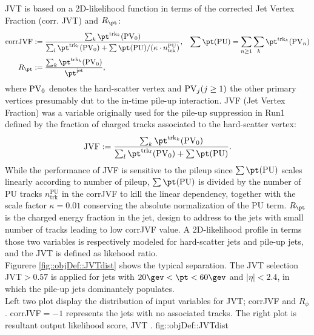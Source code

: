 JVT is based on a 2D-likelihood function in terms of the corrected Jet Vertex Fraction (corr. JVT) and $R_{\pt}$:
\begin{align}
\mathrm{corrJVF} & := \frac{ \sum_k \pttk (\pv_0)  }{\sum_l \pttl (\pv_0) + \sum\pt(\mathrm{PU})/ (\kappa \cdot n_{\mathrm{trk}}^{\mathrm{PU}} )  }
,  \,\,\,\,\,  \sum\pt(\mathrm{PU}) = \sum_{n \ge 1} \sum_k  \pttk (\pv_n)  \nn \\
R_{\pt} & := \frac{\sum_k \pttk (\pv_0) }{\pt^{\mathrm{jet}}},
\end{align}
where $\mathrm{PV}_0$ denotes the hard-scatter vertex and  $\mathrm{PV}_j (j \ge 1)$ the other primary vertices presumably dut to the in-time pile-up interaction. 
JVF (Jet Vertex Fraction) was a variable originally used for the pile-up suppression in Run1 \cite{JVF} defined by the fraction of charged tracks associated to the hard-scatter vertex:
\begin{align}
\mathrm{JVF} := \frac{ \sum_k \pttk (\pv_0)  }{ \sum_l \pttl (\pv_0) + \sum\pt(\mathrm{PU}) }.
\end{align}
While the performance of JVF is sensitive to the pileup since $\sum\pt(\mathrm{PU})$ scales linearly according to number of pileup, $\sum\pt(\mathrm{PU})$ is divided by the number of PU tracks $n_{\mathrm{trk}}^{\mathrm{PU}}$ in the corrJVF to kill the linear dependency, together with the scale factor $\kappa=0.01$ conserving the absolute normalization of the PU term.
$R_{\pt}$ is the charged energy fraction in the jet, design to address to the jets with small number of tracks leading to low corrJVF value.
A 2D-likelihood profile in terms those two variables is respectively modeled for hard-scatter jets and pile-up jets, and the JVT is defined as likehood ratio. \\

Figurere \ref{fig::objDef::JVTdist} shows the typical separation.
The JVT selection JVT$>0.57$ is applied for jets with $20 \gev < \pt< 60\gev$ and $|\eta|<2.4$, in which the pile-up jets dominantely populates.  \\


%

{Left two plot display the distribution of input variables for JVT; corrJVF and $R_\phi$. corrJVF$=-1$ represents the jets with no associated tracks. The right plot is resultant output likelihood score,  JVT  \cite{155_JVT}.
}
{fig::objDef::JVTdist}

